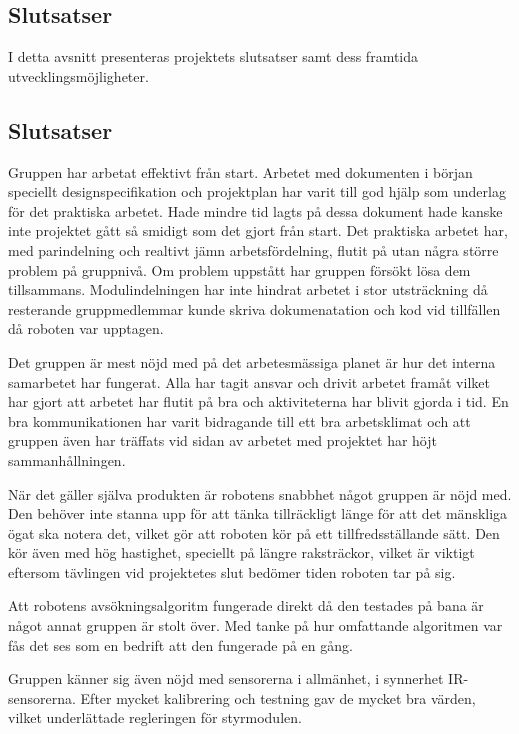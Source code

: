 \documentclass[11pt]{article}
\begin{document}
\begin{flushleft}
\pagebreak

\section{Slutsatser}
I detta avsnitt presenteras projektets slutsatser samt dess framtida utvecklingsmöjligheter.

\subsection{Slutsatser}
Gruppen har arbetat effektivt från start. Arbetet med dokumenten i början speciellt designspecifikation och projektplan har varit till god hjälp som underlag för det praktiska arbetet. Hade mindre tid lagts på dessa dokument hade kanske inte projektet gått så smidigt som det gjort från start. Det praktiska arbetet har, med parindelning och realtivt jämn arbetsfördelning, flutit på utan några större problem på gruppnivå. Om problem uppstått har gruppen försökt lösa dem tillsammans. Modulindelningen har inte hindrat arbetet i stor utsträckning då resterande gruppmedlemmar kunde skriva dokumenatation och kod vid tillfällen då roboten var upptagen. 

Det gruppen är mest nöjd med på det arbetesmässiga planet är hur det interna samarbetet har fungerat. Alla har tagit ansvar och drivit arbetet framåt vilket har gjort att arbetet har flutit på bra och aktiviteterna har blivit gjorda i tid. En bra kommunikationen har varit bidragande till ett bra arbetsklimat och att gruppen även har träffats vid sidan av arbetet med projektet har höjt sammanhållningen.

När det gäller själva produkten är robotens snabbhet något gruppen är nöjd med. Den behöver inte stanna upp för att tänka tillräckligt länge för att det mänskliga ögat ska notera det, vilket gör att roboten kör på ett tillfredsställande sätt. Den kör även med hög hastighet, speciellt på längre raksträckor, vilket är viktigt eftersom tävlingen vid projektetes slut bedömer tiden roboten tar på sig. 

Att robotens avsökningsalgoritm fungerade direkt då den testades på bana är något annat gruppen är stolt över. Med tanke på hur omfattande algoritmen var fås det ses som en bedrift att den fungerade på en gång. 

Gruppen känner sig även nöjd med sensorerna i allmänhet, i synnerhet IR-sensorerna. Efter mycket kalibrering och testning gav de mycket bra värden, vilket underlättade regleringen för styrmodulen.


\end{flushleft}
\end{document}
